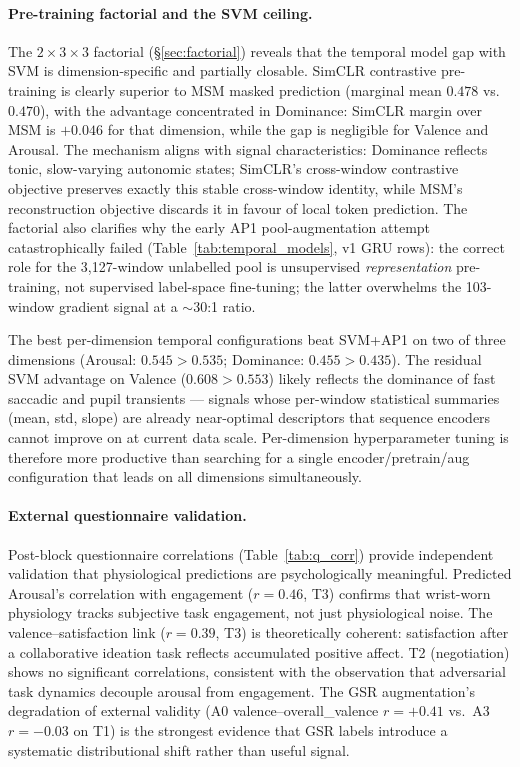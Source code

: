 \documentclass[sigconf,nonacm]{acmart}
\begin{document}
\paragraph{Pre-training factorial and the SVM ceiling.}
The $2{\times}3{\times}3$ factorial (\S\ref{sec:factorial}) reveals that the
temporal model gap with SVM is dimension-specific and partially closable.
SimCLR contrastive pre-training is clearly superior to MSM masked prediction
(marginal mean $0.478$ vs.\ $0.470$), with the advantage concentrated in
Dominance: SimCLR margin over MSM is $+0.046$ for that dimension, while the
gap is negligible for Valence and Arousal.
The mechanism aligns with signal characteristics: Dominance reflects tonic,
slow-varying autonomic states; SimCLR's cross-window contrastive objective
preserves exactly this stable cross-window identity, while MSM's
reconstruction objective discards it in favour of local token prediction.
The factorial also clarifies why the early AP1 pool-augmentation attempt
catastrophically failed (Table~\ref{tab:temporal_models}, v1 GRU rows):
the correct role for the 3{,}127-window unlabelled pool is unsupervised
\emph{representation} pre-training, not supervised label-space fine-tuning;
the latter overwhelms the 103-window gradient signal at a $\sim$30:1 ratio.

The best per-dimension temporal configurations beat SVM+AP1 on two of three
dimensions (Arousal: $0.545 > 0.535$; Dominance: $0.455 > 0.435$).
The residual SVM advantage on Valence ($0.608 > 0.553$) likely reflects
the dominance of fast saccadic and pupil transients --- signals whose
per-window statistical summaries (mean, std, slope) are already near-optimal
descriptors that sequence encoders cannot improve on at current data scale.
Per-dimension hyperparameter tuning is therefore more productive than
searching for a single encoder/pretrain/aug configuration that leads on all
dimensions simultaneously.

\paragraph{External questionnaire validation.}
Post-block questionnaire correlations (Table~\ref{tab:q_corr}) provide
independent validation that physiological predictions are psychologically
meaningful.
Predicted Arousal's correlation with engagement ($r{=}0.46$, T3) confirms
that wrist-worn physiology tracks subjective task engagement, not just
physiological noise.
The valence--satisfaction link ($r{=}0.39$, T3) is theoretically coherent:
satisfaction after a collaborative ideation task reflects accumulated positive
affect.
T2 (negotiation) shows no significant correlations, consistent with the
observation that adversarial task dynamics decouple arousal from engagement.
The GSR augmentation's degradation of external validity (A0 valence--overall\_valence
$r{=}{+}0.41$ vs.\ A3 $r{=}{-}0.03$ on T1) is the strongest evidence that
GSR labels introduce a systematic distributional shift rather than useful signal.
\end{document}
